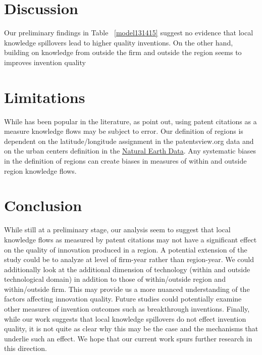 \documentclass[12pt]{article}
\begin{document}
\section*{Discussion}
Our preliminary findings in Table ~\ref{model131415} suggest no evidence that local knowledge spillovers lead to higher quality inventions. On the other hand, building on knowledge from outside the firm and outside the region seems to improves invention quality

\section*{Limitations}
While has been popular in the literature, as \cite{Arora2017} point out, using patent citations as a measure knowledge flows may be subject to error. Our definition of regions is dependent on the latitude/longitude assignment in the patentsview.org data and on the urban centers definition in the \href{http://www.naturalearthdata.com/downloads/10m-cultural-vectors/}{Natural Earth Data}. Any systematic biases in the definition of regions can create biases in measures of within and outside region knowledge flows. 


\section*{Conclusion}
While still at a preliminary stage, our analysis seem to suggest that local knowledge flows as measured by patent citations may not have a significant effect on the quality of innovation produced in a region. A potential extension of the study could be to analyze at level of firm-year rather than region-year. We could additionally look at the additional dimension of technology (within and outside technological domain) in addition to those of within/outside region and within/outside firm. This may provide us a more nuanced understanding of the factors affecting innovation quality. Future studies could potentially examine other measures of invention outcomes such as breakthrough inventions. Finally, while our work suggests that local knowledge spillovers do not effect invention quality, it is not quite as clear why this may be the case and the mechanisms that underlie such an effect. We hope that our current work spurs further research in this direction.  
\end{document}
